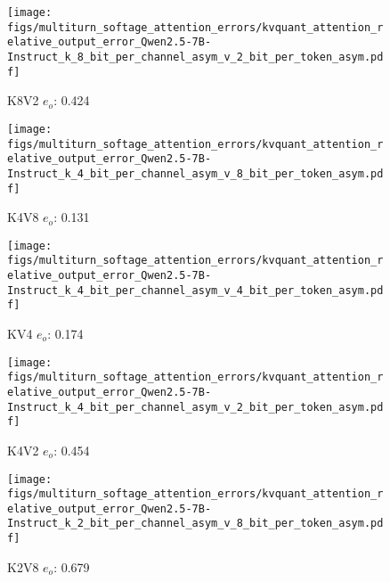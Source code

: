 \begin{figure*}
\begin{subfigure}{0.25\columnwidth}
    \end{subfigure}
    \begin{subfigure}{0.25\columnwidth}
    \texttt{[image: figs/multiturn\_softage\_attention\_errors/kvquant\_attention\_relative\_output\_error\_Qwen2.5-7B-Instruct\_k\_8\_bit\_per\_channel\_asym\_v\_2\_bit\_per\_token\_asym.pdf]}
    \caption{K8V2 $e_o$: 0.424}
    \label{fig:kvcache_simulated_quant_error_layer_wise_k8_bit_per_channel_asym_v2_per_token_asym_Qwen2.5-7B-Instruct_multirurn_softage}
    \end{subfigure}
    \begin{subfigure}{0.25\columnwidth}
    \texttt{[image: figs/multiturn\_softage\_attention\_errors/kvquant\_attention\_relative\_output\_error\_Qwen2.5-7B-Instruct\_k\_4\_bit\_per\_channel\_asym\_v\_8\_bit\_per\_token\_asym.pdf]}
    \caption{K4V8 $e_o$: 0.131}
    \label{fig:kvcache_simulated_quant_error_layer_wise_k4_bit_per_channel_asym_v8_per_token_asym_Qwen2.5-7B-Instruct_multirurn_softage}
    \end{subfigure}
    \begin{subfigure}{0.25\columnwidth}
    \texttt{[image: figs/multiturn\_softage\_attention\_errors/kvquant\_attention\_relative\_output\_error\_Qwen2.5-7B-Instruct\_k\_4\_bit\_per\_channel\_asym\_v\_4\_bit\_per\_token\_asym.pdf]}
    \caption{KV4 $e_o$: 0.174}
    \label{fig:kvcache_simulated_quant_error_layer_wise_k4_bit_per_channel_asym_v4_per_token_asym_Qwen2.5-7B-Instruct_multirurn_softage}
    \end{subfigure}
    \begin{subfigure}{0.25\columnwidth}
    \texttt{[image: figs/multiturn\_softage\_attention\_errors/kvquant\_attention\_relative\_output\_error\_Qwen2.5-7B-Instruct\_k\_4\_bit\_per\_channel\_asym\_v\_2\_bit\_per\_token\_asym.pdf]}
    \caption{K4V2 $e_o$: 0.454}
    \label{fig:kvcache_simulated_quant_error_layer_wise_k4_bit_per_channel_asym_v2_per_token_asym_Qwen2.5-7B-Instruct_multirurn_softage}
    \end{subfigure}
    \begin{subfigure}{0.25\columnwidth}
    \texttt{[image: figs/multiturn\_softage\_attention\_errors/kvquant\_attention\_relative\_output\_error\_Qwen2.5-7B-Instruct\_k\_2\_bit\_per\_channel\_asym\_v\_8\_bit\_per\_token\_asym.pdf]}
    \caption{K2V8 $e_o$: 0.679}
    \label{fig:kvcache_simulated_quant_error_layer_wise_k2_bit_per_channel_asym_v8_per_token_asym_Qwen2.5-7B-Instruct_multirurn_softage}
    \end{subfigure}
    \begin{subfigure}{0.25\columnwidth}

\end{subfigure}
\end{figure*}
